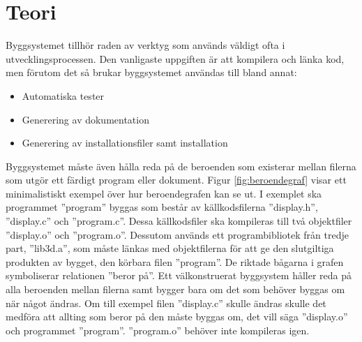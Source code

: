 \section{Teori}
Byggsystemet tillhör raden av verktyg som används väldigt ofta i utvecklingsprocessen. Den vanligaste uppgiften är att kompilera och länka kod, men förutom det så brukar byggsystemet användas till bland annat:

\begin{itemize}
  \item Automatiska tester
  \item Generering av dokumentation
  \item Generering av installationsfiler samt installation
\end{itemize}

Byggsystemet måste även hålla reda på de beroenden som existerar mellan filerna som utgör ett färdigt program eller dokument. Figur \ref{fig:beroendegraf} visar ett minimalistiskt exempel över hur beroendegrafen kan se ut. I exemplet ska programmet ''program'' byggas som består av källkodsfilerna ''display.h'', ''display.c'' och ''program.c''. Dessa källkodsfiler ska kompileras till två objektfiler ''display.o'' och ''program.o''. Dessutom används ett programbibliotek från tredje part, ''lib3d.a'', som måste länkas med objektfilerna för att ge den slutgiltiga produkten av bygget, den körbara filen ''program''. De riktade bågarna i grafen symboliserar relationen ''beror på''.
\newline
\newline
Ett välkonstruerat byggsystem håller reda på alla beroenden mellan filerna samt bygger bara om det som behöver byggas om när något ändras. Om till exempel filen ''display.c'' skulle ändras skulle det medföra att allting som beror på den måste byggas om, det vill säga ''display.o'' och programmet ''program''. ''program.o'' behöver inte kompileras igen.

